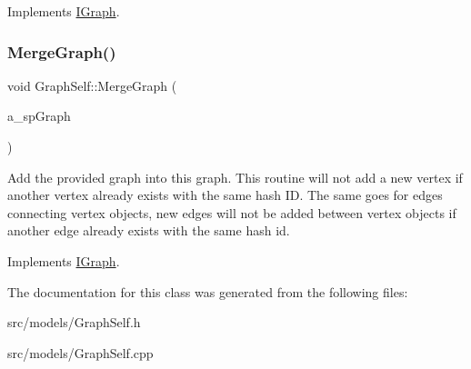 Implements \hyperlink{class_i_graph_a46918c61445d33e70de6636b81e0a829}{I\+Graph}.

\mbox{\label{class_graph_self_a64103889965233bb574b55bf2b7b1188}} 
\subsubsection{\texorpdfstring{Merge\+Graph()}{MergeGraph()}}
{\footnotesize\ttfamily void Graph\+Self\+::\+Merge\+Graph (\begin{DoxyParamCaption}\item[{const I\+Graph\+::\+SP \&}]{a\+\_\+sp\+Graph }\end{DoxyParamCaption})\hspace{0.3cm}{\ttfamily [virtual]}}

Add the provided graph into this graph. This routine will not add a new vertex if another vertex already exists with the same hash ID. The same goes for edges connecting vertex objects, new edges will not be added between vertex objects if another edge already exists with the same hash id. 

Implements \hyperlink{class_i_graph_ac18561fc46a616fde450687f557897ac}{I\+Graph}.



The documentation for this class was generated from the following files\+:\begin{DoxyCompactItemize}
\item 
src/models/Graph\+Self.\+h\item 
src/models/Graph\+Self.\+cpp\end{DoxyCompactItemize}
